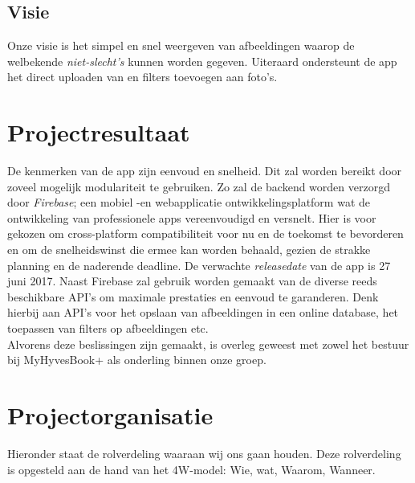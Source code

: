 \documentclass{uva-inf-article}
\begin{document}
\subsection{Visie}
Onze visie is het simpel en snel weergeven van afbeeldingen waarop de welbekende \textit{niet-slecht's} kunnen worden gegeven. Uiteraard ondersteunt de app het direct uploaden van en filters toevoegen aan foto's.


\section{Projectresultaat}
De kenmerken van de app zijn eenvoud en snelheid. Dit zal worden bereikt door zoveel mogelijk modulariteit te gebruiken. Zo zal de backend worden verzorgd door \textit{Firebase}; een mobiel -en webapplicatie ontwikkelingsplatform wat de ontwikkeling van professionele apps vereenvoudigd en versnelt. Hier is voor gekozen om cross-platform compatibiliteit voor nu en de toekomst te bevorderen en om de snelheidswinst die ermee kan worden behaald, gezien de strakke planning en de naderende deadline. De verwachte \textit{releasedate} van de app is 27 juni 2017.
Naast Firebase zal gebruik worden gemaakt van de diverse reeds beschikbare API's om maximale prestaties en eenvoud te garanderen. Denk hierbij aan API's voor het opslaan van afbeeldingen in een online database, het toepassen van filters op afbeeldingen etc. 
\linebreak
\\
Alvorens deze beslissingen zijn gemaakt, is overleg geweest met zowel het bestuur bij MyHyvesBook+ als onderling binnen onze groep.


\section{Projectorganisatie}
Hieronder staat de rolverdeling waaraan wij ons gaan houden. Deze rolverdeling is opgesteld aan de hand van het 4W-model: Wie, wat, Waarom, Wanneer.
\end{document}
